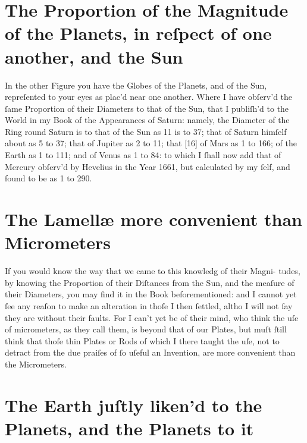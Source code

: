 \documentclass[letterpaper]{book}
\begin{document}
\section{The Proportion of the Magnitude of the Planets, in
reſpect of one another, and the Sun}

In the other Figure you have the Globes of the Planets, and of the Sun,
repreſented to your eyes as plac'd near one another. Where I have obſerv'd
the ſame Proportion of their Diameters to that of the Sun, that I publiſh'd
to the World in my Book of the Appearances of Saturn: namely, the Diameter
of the Ring round Saturn is to that of the Sun as 11 is to 37; that of
Saturn himſelf about as 5 to 37; that of Jupiter as 2 to 11; that [16] of
Mars as 1 to 166; of the Earth as 1 to 111; and of Venus as 1 to 84: to
which I ſhall now add that of Mercury obſerv'd by Hevelius in the Year 1661,
but calculated by my ſelf, and found to be as 1 to 290.


\section{The Lamellæ more convenient than Micrometers}

If you would know the way that we came to this knowledg of their Magni-
tudes, by knowing the Proportion of their Diſtances from the Sun, and the
meaſure of their Diameters, you may find it in the Book beforementioned:
and I cannot yet ſee any reaſon to make an alteration in thoſe I then ſettled,
altho I will not ſay they are without their faults.
For I can't yet be of their mind, who think the uſe of micrometers, as
they call them, is beyond that of our Plates, but muſt ſtill think that thoſe
thin Plates or Rods of which I there taught the uſe, not to detract from
the due praiſes of ſo uſeful an Invention, are more convenient than the
Micrometers.


\section{The Earth juſtly liken'd to the Planets, and the
Planets to it}
\end{document}
